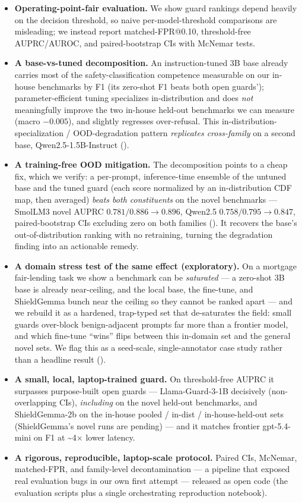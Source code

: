 \documentclass[sigconf,nonacm]{acmart}
\begin{document}
\begin{itemize}
  \item \textbf{Operating-point-fair evaluation.} We show guard rankings depend heavily on the decision threshold, so naive per-model-threshold comparisons are misleading; we instead report matched-FPR@0.10, threshold-free AUPRC/AUROC, and paired-bootstrap CIs with McNemar tests.
  \item \textbf{A base-vs-tuned decomposition.} An instruction-tuned 3B base already carries most of the safety-classification competence measurable on our in-house benchmarks by F1 (its zero-shot F1 beats both open guards'); parameter-efficient tuning specializes in-distribution and does \emph{not} meaningfully improve the two in-house held-out benchmarks we can measure (macro $-0.005$), and slightly regresses over-refusal. This in-distribution-specialization / OOD-degradation pattern \emph{replicates cross-family} on a second base, Qwen2.5-1.5B-Instruct ().
  \item \textbf{A training-free OOD mitigation.} The decomposition points to a cheap fix, which we verify: a per-prompt, inference-time ensemble of the untuned base and the tuned guard (each score normalized by an in-distribution CDF map, then averaged) \emph{beats both constituents} on the novel benchmarks --- SmolLM3 novel AUPRC $0.781/0.886 \to 0.896$, Qwen2.5 $0.758/0.795 \to 0.847$, paired-bootstrap CIs excluding zero on both families (). It recovers the base's out-of-distribution ranking with no retraining, turning the degradation finding into an actionable remedy.
  \item \textbf{A domain stress test of the same effect (exploratory).} On a mortgage fair-lending task we show a benchmark can be \emph{saturated} --- a zero-shot 3B base is already near-ceiling, and the local base, the fine-tune, and ShieldGemma bunch near the ceiling so they cannot be ranked apart --- and we rebuild it as a hardened, trap-typed set that de-saturates the field: small guards over-block benign-adjacent prompts far more than a frontier model, and which fine-tune ``wins'' flips between this in-domain set and the general novel sets. We flag this as a seed-scale, single-annotator case study rather than a headline result ().
  \item \textbf{A small, local, laptop-trained guard.} On threshold-free AUPRC it surpasses purpose-built open guards --- Llama-Guard-3-1B decisively (non-overlapping CIs), \emph{including} on the novel held-out benchmarks, and ShieldGemma-2b on the in-house pooled / in-dist / in-house-held-out sets (ShieldGemma's novel runs are pending) --- and it matches frontier gpt-5.4-mini on F1 at \textasciitilde{}4$\times$ lower latency.
  \item \textbf{A rigorous, reproducible, laptop-scale protocol.} Paired CIs, McNemar, matched-FPR, and family-level decontamination --- a pipeline that exposed real evaluation bugs in our own first attempt --- released as open code (the evaluation scripts plus a single orchestrating reproduction notebook).
\end{itemize}
\end{document}
